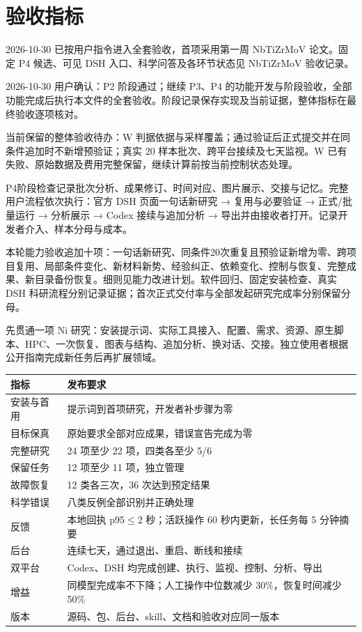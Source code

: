 \documentclass[11pt,a4paper]{ctexart}
\begin{document}
\clearpage
\section{验收指标}


2026-10-30 已按用户指令进入全套验收，首项采用第一周 NbTiZrMoV 论文。固定 P4 候选、可见 DSH 入口、科学问答及各环节状态见 NbTiZrMoV 验收记录。



2026-10-30 用户确认：P2 阶段通过；继续 P3、P4 的功能开发与阶段验收，全部功能完成后执行本文件的全套验收。阶段记录保存实现及当前证据，整体指标在最终验收逐项核对。



当前保留的整体验收待办：W 判据依据与采样覆盖；通过验证后正式提交并在同条件追加时不新增预验证；真实 20 样本批次、跨平台接续及七天监视。W 已有失败、原始数据及费用完整保留，继续计算前按当前控制状态处理。



P4阶段检查记录批次分析、成果修订、时间对应、图片展示、交接与记忆。完整用户流程依次执行：官方 DSH 页面一句话新研究 → 复用与必要验证 → 正式/\allowbreak{}批量运行 → 分析展示 → Codex 接续与追加分析 → 导出并由接收者打开。记录开发者介入、样本分母与成本。



本轮能力验收追加十项：一句话新研究、同条件20次重复且预验证新增为零、跨项目复用、局部条件变化、新材料新势、经验纠正、依赖变化、控制与恢复、完整成果、新目录备份恢复。细则见能力改进计划。软件回归、固定安装检查、真实 DSH 科研流程分别记录证据；首次正式交付率与全部发起研究完成率分别保留分母。



先贯通一项 Ni 研究：安装提示词、实际工具接入、配置、需求、资源、原生脚本、HPC、一次恢复、图表与结构、追加分析、换对话、交接。独立使用者根据公开指南完成新任务后再扩展领域。



\begin{longtable}{p{7.25cm}p{7.25cm}}
\toprule
指标 & 发布要求 \\
\midrule\endhead
安装与首用 & 提示词到首项研究，开发者补步骤为零 \\
目标保真 & 原始要求全部对应成果，错误宣告完成为零 \\
完整研究 & 24 项至少 22 项，四类各至少 5/\allowbreak{}6 \\
保留任务 & 12 项至少 11 项，独立管理 \\
故障恢复 & 12 类各三次，36 次达到预定结果 \\
科学错误 & 八类反例全部识别并正确处理 \\
反馈 & 本地回执 p95$\leq$2 秒；活跃操作 60 秒内更新，长任务每 5 分钟摘要 \\
后台 & 连续七天，通过退出、重启、断线和接续 \\
双平台 & Codex、DSH 均完成创建、执行、监视、控制、分析、导出 \\
增益 & 同模型完成率不下降；人工操作中位数减少 30\%，恢复时间减少 50\% \\
版本 & 源码、包、后台、skill、文档和验收对应同一版本 \\
\bottomrule
\end{longtable}
\end{document}
